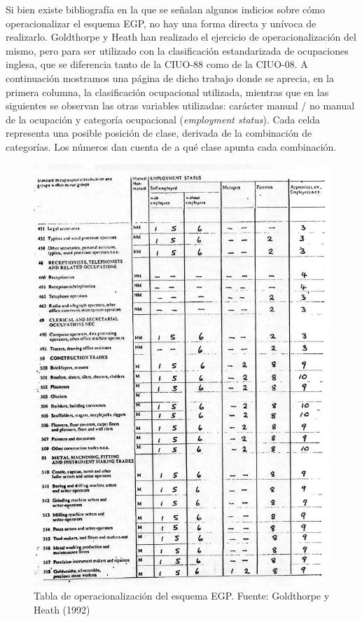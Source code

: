 \documentclass[
]{book}
\begin{document}
Si bien existe bibliografía \citep{Erikson1992, Rose.Harrison2007} en la que se señalan algunos indicios sobre cómo operacionalizar el esquema EGP, no hay una forma directa y unívoca de realizarlo. Goldthorpe y Heath \citeyearpar{Goldthorpe.Heath1992} han realizado el ejercicio de operacionalización del mismo, pero para ser utilizado con la clasificación estandarizada de ocupaciones inglesa, que se diferencia tanto de la CIUO-88 como de la CIUO-08. A continuación mostramos una página de dicho trabajo donde se aprecia, en la primera columna, la clasificación ocupacional utilizada, mientras que en las siguientes se observan las otras variables utilizadas: carácter manual / no manual de la ocupación y categoría ocupacional (\emph{employment status}). Cada celda representa una posible posición de clase, derivada de la combinación de categorías. Los números dan cuenta de a qué clase apunta cada combinación.

\begin{figure}

{\centering \includegraphics[width=0.8\linewidth]{imagenes/clasificacion_egp} 

}

\caption{Tabla de operacionalización del esquema EGP. Fuente: Goldthorpe y Heath (1992)}\label{fig:unnamed-chunk-58}
\end{figure}
\end{document}
